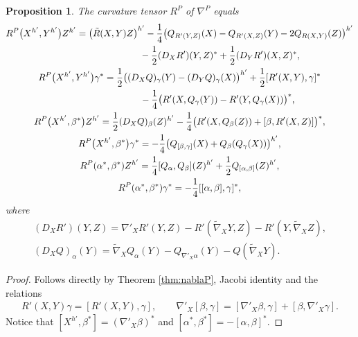 \documentclass[10pt,a4paper]{amsart}
\numberwithin{equation}{section}
\newtheorem{Proposition}[Theorem]{Proposition}
\begin{document}
\begin{Proposition}\label{prop:RP}
The curvature tensor $R^P$ of $\nabla^P$ equals
\begin{gather*}
R^P\big(X^{h'},Y^{h'}\big)Z^{h'} =\big(\tilde{R}(X,Y)Z\big)^{h'}-\frac{1}{4}\big( Q_{R'(Y,Z)}(X)-Q_{R'(X,Z)}(Y)-2Q_{R(X,Y)}(Z)\big)^{h'}\\
\hphantom{R^P\big(X^{h'},Y^{h'}\big)Z^{h'} =}{}-\frac{1}{2}(D_XR')(Y,Z)^{\ast}+\frac{1}{2}(D_YR')(X,Z)^{\ast},\\
R^P\big(X^{h'},Y^{h'}\big)\gamma^{\ast} =\frac{1}{2}\big((D_XQ)_{\gamma}(Y)-(D_YQ)_{\gamma}(X)\big)^{h'}+\frac{1}{2}[R'(X,Y),\gamma]^{\ast}\\
\hphantom{R^P\big(X^{h'},Y^{h'}\big)\gamma^{\ast} =}{}
-\frac{1}{4}\big( R'(X,Q_{\gamma}(Y))-R'(Y,Q_{\gamma}(X)) \big)^{\ast},\\
R^P\big(X^{h'},\beta^{\ast}\big)Z^{h'} =\frac{1}{2}(D_XQ)_{\beta}(Z)^{h'}-\frac{1}{4}\big( R'(X,Q_{\beta}(Z))+[\beta,R'(X,Z)] \big)^{\ast},\\
R^P\big(X^{h'},\beta^{\ast}\big)\gamma^{\ast} =-\frac{1}{4}\big( Q_{[\beta,\gamma]}(X)+Q_{\beta}(Q_{\gamma}(X)) \big)^{h'},\\
R^P(\alpha^{\ast},\beta^{\ast})Z^{h'} =\frac{1}{4}[Q_{\alpha},Q_{\beta}](Z)^{h'}+\frac{1}{2}Q_{[\alpha,\beta]}(Z)^{h'},\\
R^P(\alpha^{\ast},\beta^{\ast})\gamma^{\ast} =-\frac{1}{4}[[\alpha,\beta],\gamma]^{\ast},
\end{gather*}
where
\begin{gather*}
(D_XR')(Y,Z) =\nabla '_XR'(Y,Z)-R'(\tilde{\nabla}_XY,Z)-R'(Y,\tilde{\nabla}_XZ),\\
(D_XQ)_{\alpha}(Y) =\tilde{\nabla}_XQ_{\alpha}(Y)-Q_{\nabla '_X\alpha}(Y)-Q(\tilde{\nabla}_XY).
\end{gather*}
\end{Proposition}
\begin{proof}
Follows directly by Theorem \ref{thm:nablaP}, Jacobi identity and the relations
\begin{gather*}
R'(X,Y)\gamma=[R'(X,Y),\gamma],\qquad \nabla '_X[\beta,\gamma]=[\nabla '_X\beta,\gamma]+[\beta,\nabla '_X\gamma].
\end{gather*}
Notice that $[X^{h'},\beta^{\ast}]=(\nabla '_X\beta)^{\ast}$ and $[\alpha^{\ast},\beta^{\ast}]=-[\alpha,\beta]^{\ast}$.
\end{proof}
\end{document}

